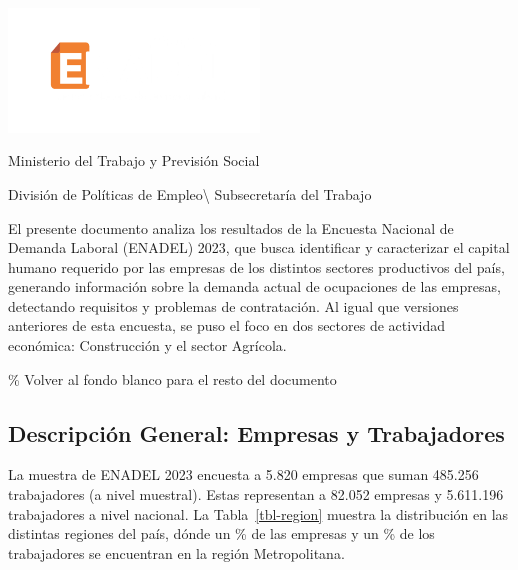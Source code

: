 \documentclass[
  11pt,
]{article}
\author{}
\date{}
\renewcommand*\contentsname{Tabla de contenidos}
\newcommand\contentsname{Tabla de contenidos}
\begin{document}



\newpage

\pagecolor{mybgcolor} 
\color{white}

\centering

\includegraphics[width=0.5\textwidth]{../Logotipo ENADEL/Logotipo ENADEL 2023.png}
\vspace{2cm}

\noindent Ministerio del Trabajo y Previsión Social

División de Políticas de Empleo\textbackslash{} Subsecretaría del
Trabajo

\justifying

El presente documento analiza los resultados de la Encuesta Nacional de
Demanda Laboral (ENADEL) 2023, que busca identificar y caracterizar el
capital humano requerido por las empresas de los distintos sectores
productivos del país, generando información sobre la demanda actual de
ocupaciones de las empresas, detectando requisitos y problemas de
contratación. Al igual que versiones anteriores de esta encuesta, se
puso el foco en dos sectores de actividad económica: Construcción y el
sector Agrícola.

\newpage

\pagecolor{white} \% Volver al fondo blanco para el resto del documento
\color{black}

\newpage
\renewcommand{\contentsname}{Índice} 
\tableofcontents

\newpage

\subsection{Descripción General: Empresas y
Trabajadores}\label{descripciuxf3n-general-empresas-y-trabajadores}

La muestra de ENADEL 2023 encuesta a 5.820 empresas que suman 485.256
trabajadores (a nivel muestral). Estas representan a 82.052 empresas y
5.611.196 trabajadores a nivel nacional. La Tabla~\ref{tbl-region}
muestra la distribución en las distintas regiones del país, dónde un
\% de las empresas y un \% de los trabajadores se
encuentran en la región Metropolitana.
\end{document}
